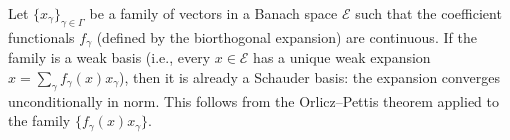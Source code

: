 Let $\{x_\gamma\}_{\gamma \in \Gamma}$ be a family of vectors in a Banach space $\mathcal{E}$ such that the coefficient functionals $f_\gamma$ (defined by the biorthogonal expansion) are continuous. If the family is a weak basis (i.e., every $x \in \mathcal{E}$ has a unique weak expansion $x = \sum_{\gamma} f_\gamma(x) x_\gamma$), then it is already a Schauder basis: the expansion converges unconditionally in norm. This follows from the Orlicz--Pettis theorem applied to the family $\{f_\gamma(x) x_\gamma\}$.
